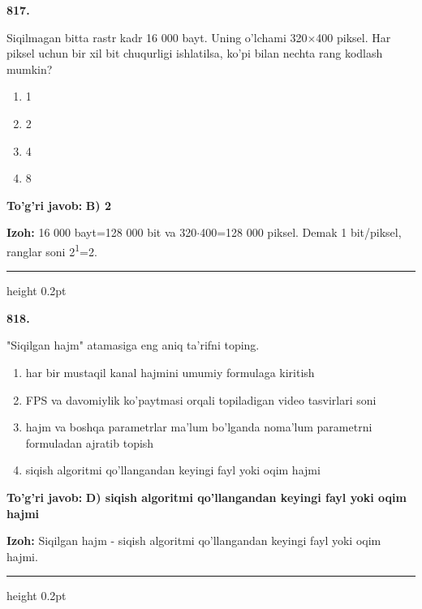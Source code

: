 \documentclass[10pt,a4paper,oneside]{article}
\begin{document}
\noindent\textbf{\color{ink}817.}
\par
Siqilmagan bitta rastr kadr 16 000 bayt. Uning o'lchami 320\ensuremath{\times}400 piksel. Har piksel uchun bir xil bit chuqurligi ishlatilsa, ko'pi bilan nechta rang kodlash mumkin?
\begin{enumerate}[label=\Alph*),leftmargin=9mm]
\item 1
\item 2
\item 4
\item 8
\end{enumerate}
\begin{tcolorbox}[enhanced,breakable,colback=teal!4,colframe=teal!50!black,boxrule=0.5pt,arc=1.1mm,left=3mm,right=3mm,top=1.7mm,bottom=1.7mm,before skip=2mm,after skip=2mm]
\textbf{\color{teal}To'g'ri javob:} \textbf{B) 2}
\par\smallskip
\textbf{Izoh:} 16 000 bayt=128 000 bit va 320\ensuremath{\cdot}400=128 000 piksel. Demak 1 bit/piksel, ranglar soni 2\textsuperscript{1}=2.
\end{tcolorbox}
\vspace{2mm}\hrule height 0.2pt \vspace{3mm}

\noindent\textbf{\color{ink}818.}
\par
"Siqilgan hajm" atamasiga eng aniq ta'rifni toping.
\begin{enumerate}[label=\Alph*),leftmargin=9mm]
\item har bir mustaqil kanal hajmini umumiy formulaga kiritish
\item FPS va davomiylik ko'paytmasi orqali topiladigan video tasvirlari soni
\item hajm va boshqa parametrlar ma'lum bo'lganda noma'lum parametrni formuladan ajratib topish
\item siqish algoritmi qo'llangandan keyingi fayl yoki oqim hajmi
\end{enumerate}
\begin{tcolorbox}[enhanced,breakable,colback=teal!4,colframe=teal!50!black,boxrule=0.5pt,arc=1.1mm,left=3mm,right=3mm,top=1.7mm,bottom=1.7mm,before skip=2mm,after skip=2mm]
\textbf{\color{teal}To'g'ri javob:} \textbf{D) siqish algoritmi qo'llangandan keyingi fayl yoki oqim hajmi}
\par\smallskip
\textbf{Izoh:} Siqilgan hajm - siqish algoritmi qo'llangandan keyingi fayl yoki oqim hajmi.
\end{tcolorbox}
\vspace{2mm}\hrule height 0.2pt \vspace{3mm}
\end{document}
